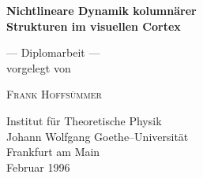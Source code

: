 \begin{titlepage}
    \Large
    \sffamily
    \vfill

    \begin{center}
    {\bfseries\huge Nichtlineare Dynamik kolumnärer\\[0.6ex] Strukturen im visuellen Cortex}

        \vfill

        {--- Diplomarbeit ---\\ vorgelegt von}

        \bigskip
        \bigskip

        \rmfamily
        \textsc{Frank Hoffsümmer}
        \sffamily

        \vfill

        \begin{figure}[h]
            \centering
        \end{figure}

        {Institut für Theoretische Physik\\
            Johann Wolfgang Goethe--Universität\\
            Frankfurt am Main\\
            Februar 1996}
    \end{center}

    \vfill
    \normalsize
    \normalfont
\end{titlepage}


\thispagestyle{plain}    %
\tableofcontents

